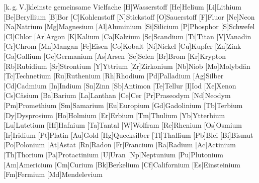{}[k.\,g.\,V.]{kleinste gemeinsame Vielfache}%
[H]{Wasserstoff}%
[He]{Helium}%
[Li]{Lithium}%
[Be]{Beryllium}%
[B]{Bor}%
[C]{Kohlenstoff}%
[N]{Stickstoff}%
[O]{Sauerstoff}%
[F]{Fluor}%
[Ne]{Neon}%
[Na]{Natrium}%
[Mg]{Magnesium}%
[Al]{Aluminium}%
[Si]{Silicium}%
[P]{Phosphor}%
[S]{Schwefel}%
[Cl]{Chlor}%
[Ar]{Argon}%
[K]{Kalium}%
[Ca]{Kalzium}%
[Sc]{Scandium}%
[Ti]{Titan}%
[V]{Vanadin}%
[Cr]{Chrom}%
[Mn]{Mangan}%
[Fe]{Eisen}%
[Co]{Kobalt}%
[Ni]{Nickel}%
[Cu]{Kupfer}%
[Zn]{Zink}%
[Ga]{Gallium}%
[Ge]{Germanium}%
[As]{Arsen}%
[Se]{Selen}%
[Br]{Brom}%
[Kr]{Krypton}%
[Rb]{Rubidium}%
[Sr]{Strontium}%
[Y]{Yttrium}%
[Zr]{Zirkonium}%
[Nb]{Niob}%
[Mo]{Molybd\"an}%
[Tc]{Technetium}%
[Ru]{Ruthenium}%
[Rh]{Rhodium}%
[Pd]{Palladium}%
[Ag]{Silber}%
[Cd]{Cadmium}%
[In]{Indium}%
[Sn]{Zinn}%
[Sb]{Antimon}%
[Te]{Tellur}%
[I]{Iod}%
[Xe]{Xenon}%
[Cs]{C\"asium}%
[Ba]{Barium}%
[La]{Lanthan}%
[Ce]{Cer}%
[Pr]{Praseodym}%
[Nd]{Neodym}%
[Pm]{Promethium}%
[Sm]{Samarium}%
[Eu]{Europium}%
[Gd]{Gadolinium}%
[Tb]{Terbium}%
[Dy]{Dysprosium}%
[Ho]{Holmium}%
[Er]{Erbium}%
[Tm]{Thulium}%
[Yb]{Ytterbium}%
[Lu]{Lutetium}%
[Hf]{Hafnium}%
[Ta]{Tantal}%
[W]{Wolfram}%
[Re]{Rhenium}%
[Os]{Osmium}%
[Ir]{Iridium}%
[Pt]{Platin}%
[Au]{Gold}%
[Hg]{Quecksilber}%
[Tl]{Thallium}%
[Pb]{Blei}%
[Bi]{Bismut}%
[Po]{Polonium}%
[At]{Astat}%
[Rn]{Radon}%
[Fr]{Francium}%
[Ra]{Radium}%
[Ac]{Actinium}%
[Th]{Thorium}%
[Pa]{Protactinium}%
[U]{Uran}%
[Np]{Neptunium}%
[Pu]{Plutonium}%
[Am]{Americium}%
[Cm]{Curium}%
[Bk]{Berkelium}%
[Cf]{Californium}%
[Es]{Einsteinium}%
[Fm]{Fermium}%
[Md]{Mendelevium}%
